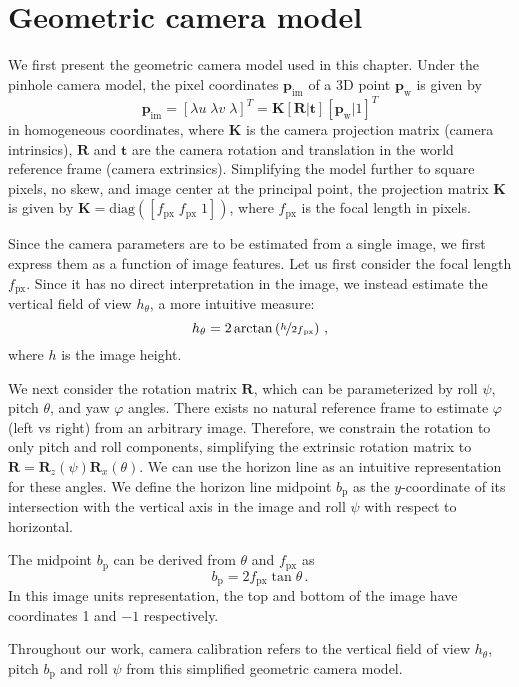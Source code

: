 \section{Geometric camera model}
\label{sec:camera-model}

We first present the geometric camera model used in this chapter. 
Under the pinhole camera model, the pixel coordinates $\mathbf{p}_\mathrm{im}$ of a 3D point $\mathbf{p}_\mathrm{w}$ is given by
%
\begin{equation}
\mathbf{p}_{\mathrm{im}} = [\lambda u \; \lambda v \; \lambda]^T = \mathbf{K} \left[\mathbf{R} | \mathbf{t}\right] \left[ \mathbf{p}_{\mathrm{w}} | 1 \right]^T
\end{equation}
%
in homogeneous coordinates, where $\mathbf{K}$ is the camera projection matrix (camera intrinsics), $\mathbf{R}$ and $\mathbf{t}$ are the camera rotation and translation in the world reference frame (camera extrinsics). Simplifying the model further to square pixels, no skew, and image center at the principal point, the projection matrix $\mathbf{K}$ is given by $\mathbf{K} = \mathrm{diag}([f_{\mathrm{px}} \; f_{\mathrm{px}} \; 1])$, where $f_{\mathrm{px}}$ is the focal length in pixels. 

Since the camera parameters are to be estimated from a single image, we first express them as a function of image features. Let us first consider the focal length $f_\mathrm{px}$. Since it has no direct interpretation in the image, we instead estimate the vertical field of view $h_\theta$, a more intuitive measure:
%
\begin{equation}
h_{\theta} = 2 \arctan \left( \nicefrac{ h }{ 2f{_\mathrm{px}} } \right) \,,
\end{equation}
%
where $h$ is the image height.

We next consider the rotation matrix $\mathbf{R}$, which can be parameterized by roll $\psi$, pitch $\theta$, and yaw $\varphi$ angles. There exists no natural reference frame to estimate $\varphi$ (left vs right) from an arbitrary image. Therefore, we constrain the rotation to only pitch and roll components, simplifying the extrinsic rotation matrix to $\mathbf{R} = \mathbf{R}_z(\psi) \mathbf{R}_x(\theta)$. We can use the horizon line as an intuitive representation for these angles. We define the horizon line midpoint $b_{\mathrm{p}}$ as the $y$-coordinate of its intersection with the vertical axis in the image and roll $\psi$ with respect to horizontal.

The midpoint $b_{\mathrm{p}}$ can be derived from $\theta$ and $f_{\mathrm{px}}$ as
%
\begin{equation}
b_{\mathrm{p}} = 2 f_{\mathrm{px}} \tan\theta \,.
\label{eq:horizon_midpoint}
\end{equation}
%
In this image units representation, the top and bottom of the image have coordinates 1 and $-1$ respectively. 

Throughout our work, camera calibration refers to the vertical field of view $h_{\theta}$, pitch $b_{\mathrm{p}}$ and roll $\psi$ from this simplified geometric camera model.
